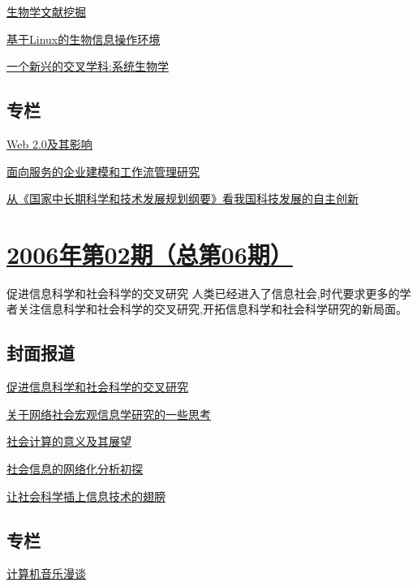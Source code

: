 \documentclass[a4paper]{article}
\begin{document}
\href{http://history.ccf.org.cn/resources/1190201776262/2010/04/15/007044.pdf}{生物学文献挖掘}

\href{http://history.ccf.org.cn/resources/1190201776262/2010/04/15/007057.pdf}{基于Linux的生物信息操作环境}

\href{http://history.ccf.org.cn/resources/1190201776262/2010/04/15/007062.pdf}{一个新兴的交叉学科:系统生物学}

\subsection{专栏}
\href{http://history.ccf.org.cn/resources/1190201776262/2010/04/15/007070.pdf}{Web 2.0及其影响}

\href{http://history.ccf.org.cn/resources/1190201776262/2010/04/15/007077.pdf}{面向服务的企业建模和工作流管理研究}

\href{http://history.ccf.org.cn/resources/1190201776262/2010/04/15/007080.pdf}{从《国家中长期科学和技术发展规划纲要》看我国科技发展的自主创新}


\section{\href{http://history.ccf.org.cn/sites/ccf/jsjtbbd.jsp?contentId=2542567628935}{\textbf{2006年第02期（总第06期）}}}
促进信息科学和社会科学的交叉研究 人类已经进入了信息社会,时代要求更多的学者关注信息科学和社会科学的交叉研究,开拓信息科学和社会科学研究的新局面。
\subsection{封面报道}
\href{http://history.ccf.org.cn/resources/1190201776262/2010/04/15/006022.pdf}{促进信息科学和社会科学的交叉研究}

\href{http://history.ccf.org.cn/resources/1190201776262/2010/04/15/006023.pdf}{关于网络社会宏观信息学研究的一些思考}

\href{http://history.ccf.org.cn/resources/1190201776262/2010/04/15/006028.pdf}{社会计算的意义及其展望}

\href{http://history.ccf.org.cn/resources/1190201776262/2010/04/15/006036.pdf}{社会信息的网络化分析初探}

\href{http://history.ccf.org.cn/resources/1190201776262/2010/04/15/006043.pdf}{让社会科学插上信息技术的翅膀}

\subsection{专栏}
\href{http://history.ccf.org.cn/resources/1190201776262/2010/04/15/006048.pdf}{计算机音乐漫谈}
\end{document}
